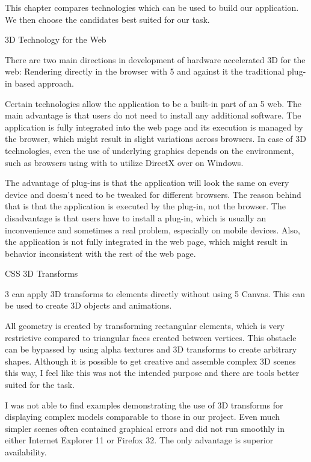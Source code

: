 This chapter compares technologies which can be used to build our application. We then choose the candidates best suited for our task.

\sec 3D Technology for the Web

There are two main directions in development of hardware accelerated 3D for the web: Rendering directly in the browser with 5 and against it the traditional plug-in based approach.

Certain technologies allow the application to be a built-in part of an 5 web. The main advantage is that users do not need to install any additional software. The application is fully integrated into the web page and its execution is managed by the browser, which might result in slight variations across browsers. In case of 3D technologies, even the use of underlying graphics  depends on the environment, such as browsers using  with  to utilize DirectX over  on Windows.

The advantage of plug-ins is that the application will look the same on every device and doesn’t need to be tweaked for different browsers. The reason behind that is that the application is executed by the plug-in, not the browser. The disadvantage is that users have to install a plug-in, which is usually an inconvenience and sometimes a real problem, especially on mobile devices. Also, the application is not fully integrated in the web page, which might result in behavior inconsistent with the rest of the web page.

\secc CSS 3D Transforms

3 can apply 3D transforms to elements directly without using 5 Canvas. This can be used to create 3D objects and animations.

All geometry is created by transforming rectangular elements, which is very restrictive compared to triangular faces created between vertices. This obstacle can be bypassed by using alpha textures and 3D transforms to create arbitrary shapes. Although it is possible to get creative and assemble complex 3D scenes this way, I feel like this was not the intended purpose and there are tools better suited for the task.

I was not able to find examples demonstrating the use of  3D transforms for displaying complex models comparable to those in our project. Even much simpler scenes often contained graphical errors and did not run smoothly in either Internet Explorer 11 or Firefox 32. The only advantage is superior availability.

